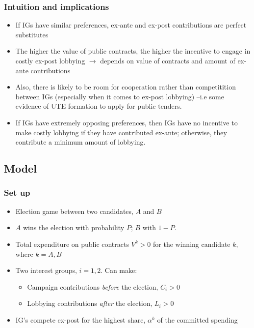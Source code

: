 \documentclass[handout,final,xcolor=dvipsnames]{beamer}
\begin{document}
   \begin{frame}\frametitle{Intuition and implications}
     \begin{itemize}\itemsep 10pt
       \item If IGs have similar preferences, ex-ante and ex-post
         contributions are perfect substitutes
         \item The higher the value of public contracts, the higher the
           incentive to engage in costly ex-post lobbying
           $\longrightarrow$ depends on value of contracts and amount
           of ex-ante contributions
  \item Also, there is likely
    to be room for cooperation rather than competitition between IGs
    (especially when it comes to ex-post lobbying) --i.e some evidence
    of UTE formation to apply for public tenders. 
    \item If IGs have extremely opposing preferences, then
      IGs have no incentive to make costly lobbying if they have
      contributed ex-ante; otherwise, they contribute a minimum amount
      of lobbying. 
       \end{itemize}
  \end{frame}


  \subsection{Model}

\begin{frame}\frametitle{Set up}
  \begin{itemize}\itemsep 10pt
  \item Election game between two candidates, $A$ and $B$
    \item $A$ wins the election with probability $P$; $B$ with $1-P$.
      \item Total expenditure on public contracts $V^k>0$ for the
        winning candidate $k$, where $k=A,B$
      \item Two interest groups, $i=1,2$. Can make:
        \begin{itemize}\itemsep 5pt \medskip
        \item Campaign contributions \textit{before} the election, $C_i>0$
        \item Lobbying contributions \textit{after} the election, $L_i>0$
        \end{itemize}
        \item IG's compete ex-post for the highest share, $\alpha^k$
          of the committed spending
        \end{itemize}
      
  \end{frame}
\end{document}
